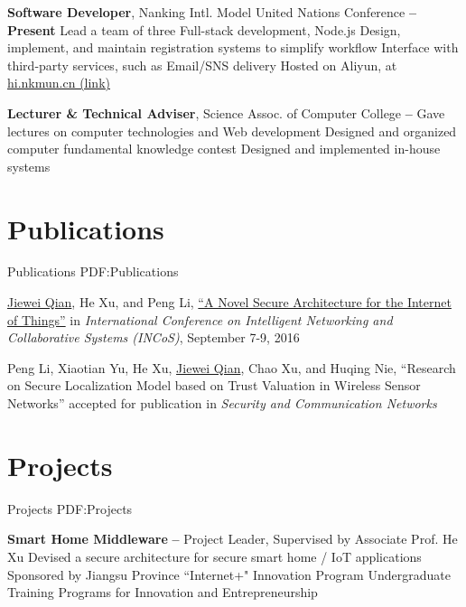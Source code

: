 \documentclass[a4paper,MMMyyyy,nonstop]{simpleresumecv}
\begin{document}
\begin{body}
\textbf{Software Developer}, Nanking Intl. Model United Nations Conference
\hfill \textbf{
      -- Present
}
\BulletItem
Lead a team of three
\BulletItem
Full-stack development, Node.js
\BulletItem
Design, implement, and maintain registration systems to simplify workflow
\BulletItem
Interface with third-party services, such as Email/SNS delivery
\BulletItem
Hosted on Aliyun, at \href{https://hi.nkmun.cn/}{hi.nkmun.cn (link)}

\GapNoBreak

\textbf{Lecturer \& Technical Adviser}, Science Assoc. of Computer College
\hfill \textbf{
     -- 
}
\BulletItem
Gave lectures on computer technologies and Web development
\BulletItem
Designed and organized computer fundamental knowledge contest
\BulletItem
Designed and implemented in-house systems


\section
{Publications}
{Publications}
{PDF:Publications}

\BulletItem
\underline{Jiewei Qian}, He Xu, and Peng Li,
\href{http://ieeexplore.ieee.org/document/7695208/}{``A Novel Secure Architecture for the Internet of Things''}{}
in \textit{International Conference on Intelligent Networking and Collaborative Systems (INCoS)}, September 7-9, 2016

\GapNoBreak

\BulletItem
Peng Li, Xiaotian Yu, He Xu, \underline{Jiewei Qian}, Chao Xu, and Huqing Nie,
``Research on Secure Localization Model based on Trust Valuation in Wireless Sensor Networks''
accepted for publication in \textit{Security and Communication Networks}


\section
{Projects}
{Projects}
{PDF:Projects}

\textbf{Smart Home Middleware}
\hfill \textbf{  --  }
\BulletItem
Project Leader, Supervised by Associate Prof. He Xu
\BulletItem
Devised a secure architecture for secure smart home / IoT applications
\BulletItem
Sponsored by Jiangsu Province ``Internet+" Innovation Program
\BulletItem
Undergraduate Training Programs for Innovation and Entrepreneurship


\end{body}
\end{document}
